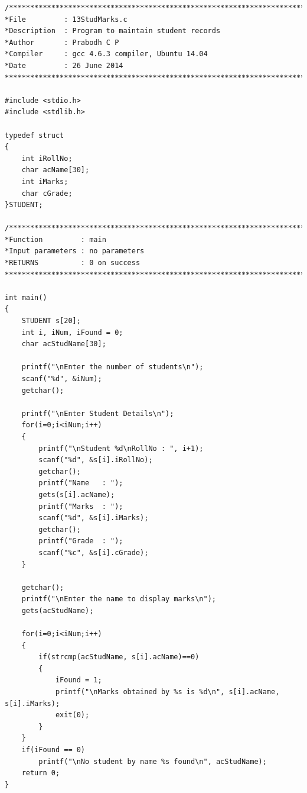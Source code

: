 \documentclass[a4paper]{report}
\begin{document}
\begin{Verbatim}
/***************************************************************************
*File         : 13StudMarks.c
*Description  : Program to maintain student records
*Author       : Prabodh C P
*Compiler     : gcc 4.6.3 compiler, Ubuntu 14.04
*Date         : 26 June 2014
***************************************************************************/

#include <stdio.h>
#include <stdlib.h>

typedef struct
{
    int iRollNo;
    char acName[30];
    int iMarks;
    char cGrade;
}STUDENT;

/***************************************************************************
*Function         :	main
*Input parameters :	no parameters
*RETURNS          :	0 on success
***************************************************************************/

int main()
{
    STUDENT s[20];
    int i, iNum, iFound = 0;
    char acStudName[30];

    printf("\nEnter the number of students\n");
    scanf("%d", &iNum);
    getchar();

    printf("\nEnter Student Details\n");
    for(i=0;i<iNum;i++)
    {
        printf("\nStudent %d\nRollNo : ", i+1);
        scanf("%d", &s[i].iRollNo);
        getchar();
        printf("Name   : ");
        gets(s[i].acName);
        printf("Marks  : ");
        scanf("%d", &s[i].iMarks);
        getchar();
        printf("Grade  : ");
        scanf("%c", &s[i].cGrade);
    }

    getchar();
    printf("\nEnter the name to display marks\n");
    gets(acStudName);

    for(i=0;i<iNum;i++)
    {
        if(strcmp(acStudName, s[i].acName)==0)
        {
            iFound = 1;
            printf("\nMarks obtained by %s is %d\n", s[i].acName, s[i].iMarks);
            exit(0);
        }
    }
    if(iFound == 0)
        printf("\nNo student by name %s found\n", acStudName);
    return 0;
}

\end{Verbatim}

\pagebreak
\end{document}
